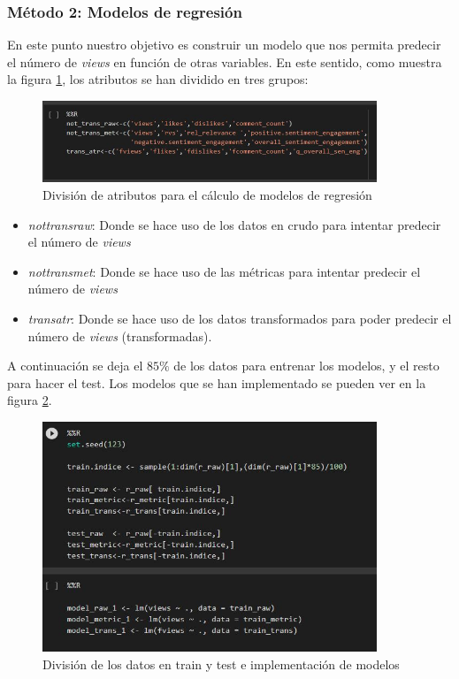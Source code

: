 \documentclass[a4paper,12pt]{article}
\begin{document}
\subsubsection{M\'etodo 2: Modelos de regresi\'on}

En este punto nuestro objetivo es construir un modelo que nos permita predecir el n\'umero de {\itshape views} en funci\'on de otras variables. En este sentido, como muestra la figura \ref{fig:regre}, los atributos se han dividido en tres grupos:

\begin{figure}[h!]
\centering
\includegraphics[width=10cm]{col.JPG}
\caption{Divisi\'on de atributos para el c\'alculo de modelos de regresi\'on}
\label{fig:regre}
\end{figure}


\begin{itemize}

\item {\itshape not{\textunderscore}trans{\textunderscore}raw}: Donde se hace uso de los datos en crudo para intentar predecir el n\'umero de {\itshape views}

\item {\itshape not{\textunderscore}trans{\textunderscore}met}: Donde se hace uso de las m\'etricas para intentar predecir el n\'umero de {\itshape views}

\item {\itshape trans{\textunderscore}atr}: Donde se hace uso de los datos transformados para poder predecir el n\'umero de {\itshape views} (transformadas).

\end{itemize}

A continuaci\'on se deja el $85\%$ de los datos para entrenar los modelos, y el resto para hacer el test. Los modelos que se han implementado se pueden ver en la figura \ref{fig:model1}.

\begin{figure}[h!]
\centering
\includegraphics[width=10cm]{modelos_1.JPG}
\caption{Divisi\'on de los datos en train y test e implementaci\'on de modelos}
\label{fig:model1}
\end{figure}
\end{document}
